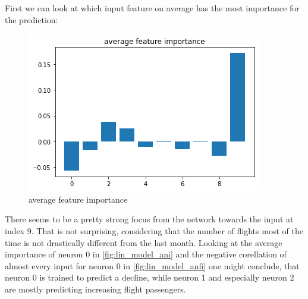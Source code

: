 \documentclass{article}
\begin{document}
First we can look at which input feature on average has the most importance for the prediction:

\begin{figure}[ht!]
\centering
\includegraphics[scale=0.6]{linear_model_avg_feature_importance.png}
\caption{average feature importance}
\label{fig:lin_model_afi}
\end{figure}

There seems to be a pretty strong focus from the network towards the input at index 9. That is not surprising, considering that the number of flights most of the time is not drastically different from the last month. Looking at the average importance of neuron 0 in \ref{fig:lin_model_ani} and the negative corellation of almost every input for neuron 0 in \ref{fig:lin_model_anfi} one might conclude, that neuron 0 is trained to predict a decline, while neuron 1 and especially neuron 2 are mostly predicting increasing flight passengers.
\end{document}
